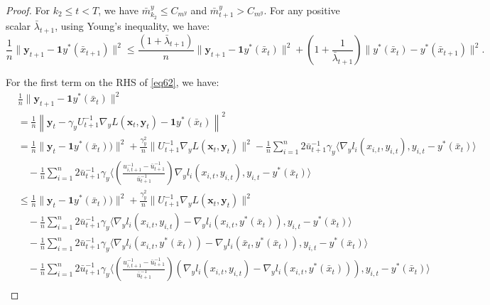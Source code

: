 \documentclass{article}
\theoremstyle{plain}
\theoremstyle{definition}
\theoremstyle{remark}
\begin{document}
\begin{proof}
For \(k_2 \leq t < T\), we have \(\bar{m}^y_{k_2} \leq C_{m^y}\) and \(\bar{m}^y_{t+1} > C_{m^y}\). For any positive scalar \(\bar{\lambda}_{t+1}\), using Young’s inequality, we have:
\begin{equation}
   \frac{1}{n}\|\mathbf{y}_{t+1} - \mathbf{1}y^*(\bar{x}_{t+1})\|^2 
\leq \frac{(1 + \bar{\lambda}_{t+1})}{n} \|\mathbf{y}_{t+1} - \mathbf{1}y^*(\bar{x}_t)\|^2 
+ \left( 1 + \frac{1}{\bar{\lambda}_{t+1}} \right) \|y^*(\bar{x}_t) - y^*(\bar{x}_{t+1})\|^2. \label{eq62}
\end{equation}

For the first term on the RHS of \cref{eq62}, we have:
\begin{align}
&\frac{1}{n}\|\mathbf{y}_{t+1} - \mathbf{1}y^*(\bar{x}_t)\|^2 \nonumber\\
&= \frac{1}{n}\left\|\mathbf{y}_{t} - \gamma_y U^{-1}_{t+1} \nabla_y L(\mathbf{x}_t, \mathbf{y}_t) - \mathbf{1}y^*(\bar{x}_t) \right\|^2 \nonumber \\
&= \frac{1}{n}\|\mathbf{y}_{t} - \mathbf{1}y^*(\bar{x}_t))\|^2 
+ \frac{\gamma_y^2}{n} \|U^{-1}_{t+1} \nabla_y L(\mathbf{x}_t, \mathbf{y}_t)\|^2 
- \frac{1}{n}\sum_{i=1}^n 2\bar{u}_{t+1}^{-1} \gamma_y\langle \nabla_y l_i(x_{i,t}, y_{i,t}), y_{i,t}-y^*(\bar{x}_t) \rangle \nonumber \\
&\quad-\frac{1}{n}\sum_{i=1}^n 2\bar{u}_{t+1}^{-1} \gamma_y\Bigg\langle \left(\frac{u_{i,t+1}^{-1}-\bar{u}_{t+1}^{-1}}{\bar{u}_{t+1}^{-1}}\right)\nabla_y l_i(x_{i,t}, y_{i,t}), y_{i,t}-y^*(\bar{x}_t)\Bigg\rangle \nonumber\\
&\leq \frac{1}{n}\|\mathbf{y}_{t} - \mathbf{1}y^*(\bar{x}_t))\|^2 
+ \frac{\gamma_y^2}{n} \|U^{-1}_{t+1} \nabla_y L(\mathbf{x}_t, \mathbf{y}_t)\|^2 \nonumber\\
&\quad- \frac{1}{n}\sum_{i=1}^n 2\bar{u}_{t+1}^{-1} \gamma_y\langle \nabla_y l_i(x_{i,t}, y_{i,t})- \nabla_y l_i(x_{i,t}, y^*(\bar{x}_t)), y_{i,t}-y^*(\bar{x}_t) \rangle\nonumber\\
&\quad - \frac{1}{n}\sum_{i=1}^n 2\bar{u}_{t+1}^{-1} \gamma_y\langle \nabla_y l_i(x_{i,t}, y^*(\bar{x}_t))-\nabla_y l_i(\bar{x}_{t}, y^*(\bar{x}_t)), y_{i,t}-y^*(\bar{x}_t) \rangle \nonumber \\
&\quad-\frac{1}{n}\sum_{i=1}^n 2\bar{u}_{t+1}^{-1} \gamma_y\Bigg\langle \left(\frac{u_{i,t+1}^{-1}-\bar{u}_{t+1}^{-1}}{\bar{u}_{t+1}^{-1}}\right)(\nabla_y l_i(x_{i,t}, y_{i,t})- \nabla_y l_i(x_{i,t}, y^*(\bar{x}_t))), y_{i,t}-y^*(\bar{x}_t)\Bigg\rangle \nonumber\\

\end{align}
\end{proof}
\end{document}
